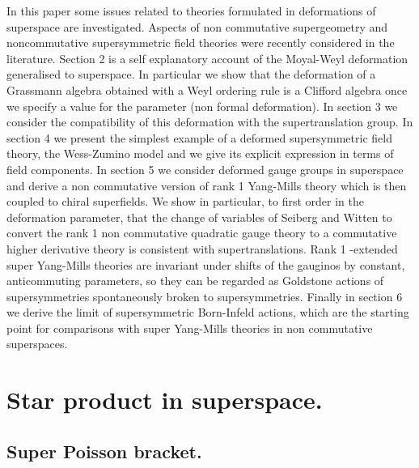 \documentclass[a4paper,12pt]{article}
\begin{document}
In this paper some issues related to  theories formulated in 
deformations of superspace are investigated. Aspects of non commutative
supergeometry \cite{ cz,s}
 and noncommutative supersymmetric field theories \cite{cr, gp, ss}
were recently considered in the literature. Section 2 is  a
self explanatory
 account of the Moyal-Weyl deformation generalised to superspace. In
particular we
 show that the 
deformation of a Grassmann algebra obtained with a Weyl ordering rule is a
Clifford algebra once we specify a value for the parameter (non formal
deformation). 
In section 3 we consider the compatibility of this deformation with the
supertranslation
group. In section 4 we present the simplest example of a deformed
supersymmetric field
theory, the Wess-Zumino model and we give its explicit expression in terms
of field
components. In section 5 we consider deformed gauge groups in superspace
and derive a non 
commutative version of rank 1 Yang-Mills theory which is then coupled to
chiral superfields. 
We show in particular, to first  order in the deformation parameter,
 that the change of
variables of Seiberg and Witten
 \cite{sw} to convert the rank 1 non commutative quadratic gauge theory to
a commutative 
higher derivative theory is consistent with supertranslations. 
Rank 1 \coordHE{}-extended 
super Yang-Mills theories are invariant under shifts of the \coordHE{}  gauginos
by \coordHE{} constant,
anticommuting parameters, so they  can be regarded as Goldstone actions of
\coordHE{}
supersymmetries spontaneously broken to \coordHE{} supersymmetries.
 Finally in section 6 we derive the \coordHE{} limit of
supersymmetric
Born-Infeld actions, which are the starting point for comparisons with 
super Yang-Mills theories in non commutative superspaces.





\section{Star product in superspace.}

\subsection{Super Poisson bracket.}
\end{document}

